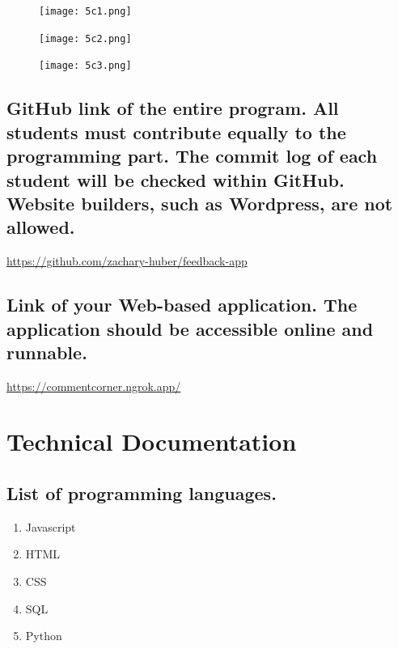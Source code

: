 \documentclass[letterpaper, 12 pt, conference]{ieeeconf}
\begin{document}
\begin{figure}[h]
\centering
\texttt{[image: 5c1.png]}
\end{figure}
\begin{figure}[h]
\centering
\texttt{[image: 5c2.png]}
\end{figure}
\begin{figure}[h]
\centering
\texttt{[image: 5c3.png]}
\end{figure}
\newpage


\linebreak
\subsection{GitHub link of the entire program. All students must contribute equally to the programming part. The commit log of each student will be checked within GitHub. Website builders, such as Wordpress, are not allowed.}
\linebreak
\url{https://github.com/zachary-huber/feedback-app}
\hfill \break

\subsection{Link of your Web-based application. The application should be accessible online and runnable.}
\linebreak
\url{https://commentcorner.ngrok.app/}
\hfill \break

\newpage

\section{Technical Documentation}
\subsection{List of programming languages.}
\begin{enumerate}
   \item Javascript
   \item HTML
   \item CSS
   \item SQL
   \item Python
\end{enumerate}
\hfill
\newline
\end{document}
